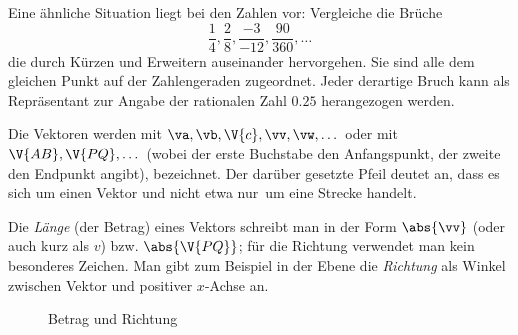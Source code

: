 \documentclass[%
11pt,%
twoside,%
titlepage,%
german,%
headsepline%
]{scrartcl}
\begin{document}
\begin{bem}
Eine ähnliche Situation liegt bei den Zahlen vor: Vergleiche die Brüche
$$\frac{1}{4}, \frac{2}{8}, \frac{-3}{-12}, \frac{90}{360}, \dots$$
die durch Kürzen und Erweitern auseinander hervorgehen. Sie sind alle dem gleichen Punkt auf der Zahlengeraden zugeordnet. Jeder derartige Bruch kann als Repräsentant zur Angabe der rationalen Zahl $0.25$ herangezogen werden.
\end{bem}

Die Vektoren werden mit $\va, \vb, \V{c}, \vv, \vw, \dots$ oder mit $\V{AB}, \V{PQ},\dots$ (wobei der erste Buchstabe den Anfangspunkt, der zweite den Endpunkt angibt), bezeichnet.
Der darüber gesetzte Pfeil deutet an, dass es sich um einen Vektor und nicht etwa \glqq nur\grqq\ um eine Strecke handelt.

Die \emph{Länge} (der Betrag) eines Vektors schreibt man in der Form $\abs{\vv}$ (oder auch kurz als $v$) bzw. $\abs{\V{PQ}}$; für die Richtung verwendet man kein besonderes Zeichen. Man gibt zum Beispiel in der Ebene die \emph{Richtung} als Winkel zwischen Vektor und positiver $x$-Achse an.

\begin{figure}[ht]
\begin{center}
\end{center}
\caption{Betrag und Richtung}\label{vecdef}
\end{figure}
\end{document}
